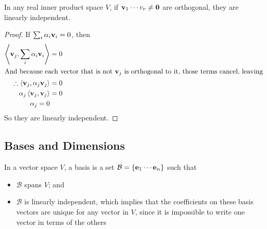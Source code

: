 \begin{lemma}
	In any real inner product space \(V\), if \(\vb v_1 \cdots v_r \neq \vb 0\) are orthogonal, they are linearly independent.
\end{lemma}
\begin{proof}
	If \(\sum_i \alpha_i \vb v_i = 0\), then
	\begin{align*}
		\left\langle \vb v_j, \sum_i \alpha_i \vb v_i \right\rangle     & = 0 \\
		\intertext{And because each vector that is not \(\vb v_j\) is orthogonal to it, those terms cancel, leaving}
		\therefore \left\langle \vb v_j, \alpha_j \vb v_j \right\rangle & = 0 \\
		\alpha_j \left\langle \vb v_j, \vb v_j \right\rangle            & = 0 \\
		\alpha_j = 0
	\end{align*}
	So they are linearly independent.
\end{proof}

\subsection{Bases and Dimensions}
In a vector space \(V\), a basis is a set \(\mathcal B = \{ \vb e_1 \cdots \vb e_n \}\) such that
\begin{itemize}
	\item \(\mathcal B\) spans \(V\); and
	\item \(\mathcal B\) is linearly independent, which implies that the coefficients on these basis vectors are unique for any vector in \(V\), since it is impossible to write one vector in terms of the others
\end{itemize}

